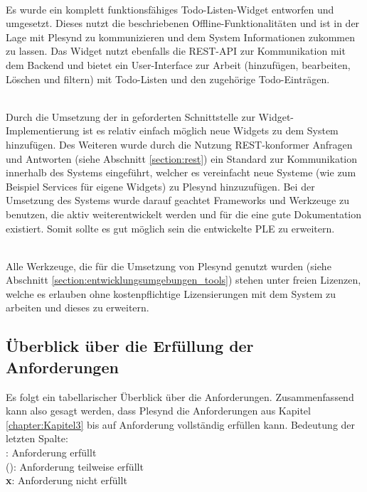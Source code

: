 \textbullet{}  \emph{\requirementExampleWidget}\\
Es wurde ein komplett funktionsfähiges Todo-Listen-Widget entworfen und umgesetzt. Dieses nutzt die beschriebenen Offline-Funktionalitäten und ist in der Lage mit Plesynd zu kommunizieren und dem System Informationen zukommen zu lassen. Das Widget nutzt ebenfalls die REST-API zur Kommunikation mit dem Backend und bietet ein User-Interface zur Arbeit (hinzufügen, bearbeiten, Löschen und filtern) mit Todo-Listen und den zugehörige Todo-Einträgen.

\textbullet{}  \emph{\requirementExtensibility}\\
Durch die Umsetzung der in  geforderten Schnittstelle zur Widget-Implementierung ist es relativ einfach möglich neue Widgets zu dem System hinzufügen. Des Weiteren wurde durch die Nutzung REST-konformer Anfragen und Antworten (siehe Abschnitt \ref{section:rest}) ein Standard zur Kommunikation innerhalb des Systems eingeführt, welcher es vereinfacht neue Systeme (wie zum Beispiel Services für eigene Widgets) zu Plesynd hinzuzufügen. Bei der Umsetzung des Systems wurde darauf geachtet Frameworks und Werkzeuge zu benutzen, die aktiv weiterentwickelt werden und für die eine gute Dokumentation existiert. Somit sollte es gut möglich sein die entwickelte PLE zu erweitern.

\textbullet{}  \emph{\requirementOpenSource}\\
Alle Werkzeuge, die für die Umsetzung von Plesynd genutzt wurden (siehe Abschnitt \ref{section:entwicklungsumgebungen_tools}) stehen unter freien Lizenzen, welche es erlauben ohne kostenpflichtige Lizensierungen mit dem System zu arbeiten und dieses zu erweitern.

\subsection{Überblick über die Erfüllung der Anforderungen}
Es folgt ein tabellarischer Überblick über die Anforderungen. Zusammenfassend kann also gesagt werden, dass Plesynd die Anforderungen aus Kapitel \ref{chapter:Kapitel3} bis auf Anforderung  vollständig erfüllen kann.
Bedeutung der letzten Spalte:\\
\checkmark: Anforderung erfüllt\\
(\checkmark): Anforderung teilweise erfüllt\\
\textbf{x}: Anforderung nicht erfüllt

